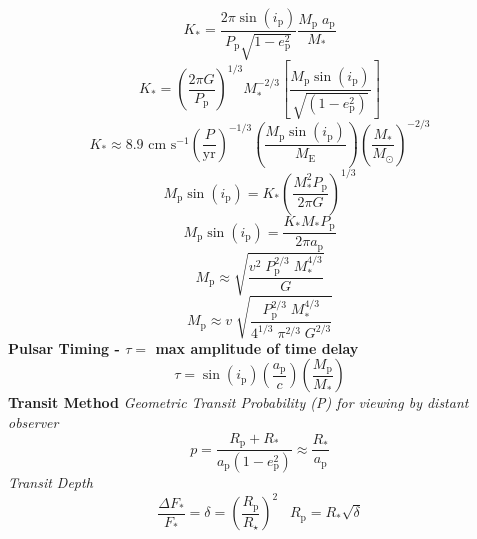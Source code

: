 \documentclass{article}
\begin{document}
\begin{equation}
K_\mathrm{*} = \frac {2 \pi \sin(i_\mathrm{p})} {P_\mathrm{p} \sqrt {1-e_\mathrm{p}^2}} \frac {M_\mathrm{p} \; a_\mathrm{p}} {M_\mathrm{*}}
\end{equation}
\begin{equation}
K_\mathrm{*} = \left(\frac {2 \pi G}{P_\mathrm{p}}\right)^{1/3} M_\mathrm{*}^{-2/3} \left[ \frac {M_\mathrm{p} \sin(i_\mathrm{p})}{\sqrt{\left(1-e_\mathrm{p}^2\right)}} \right]
\end{equation}
\begin{equation}
K_\mathrm{*} \approx 8.9 \text{ cm s}^{-1} \left( \frac{P}{\mathrm{yr}} \right)^{-1/3} \left( \frac{M_\mathrm{p} \sin(i_\mathrm{p})}{M_\mathrm{E} } \right) \left( \frac{M_\mathrm{*}}{M_\mathrm{\odot}} \right)^{-2/3}
\end{equation}
\begin{equation}
M_\mathrm{p} \sin(i_\mathrm{p}) = K_\mathrm{*} \left( \frac {M_\mathrm{*}^2 P_\mathrm{p}} {2 \pi G} \right) ^{1/3}
\end{equation}
\begin{equation}
M_\mathrm{p} \sin(i_\mathrm{p}) = \frac {K_\mathrm{*} M_\mathrm{*} P_\mathrm{p}} {2 \pi a_\mathrm{p}}
\end{equation}
\begin{equation}
M_\mathrm{p} \approx \sqrt{\frac{v^2 \; P^{2/3}_\mathrm{p} \; M^{4/3}_\mathrm{*}}{G}}
\end{equation}
\begin{equation}
M_\mathrm{p} \approx v \; \sqrt{\frac{P^{2/3}_\mathrm{p} \; M^{4/3}_\mathrm{*}}{4^{1/3} \; \pi^{2/3} \; G^{2/3}}}
\end{equation}
\textbf {Pulsar Timing - \(\tau = \) max amplitude of time delay}
\begin{equation}
\tau =  \sin(i_\mathrm{p}) \left( \frac {a_\mathrm{p}} {c} \right) \left( \frac {M_\mathrm{p}} {M_\mathrm{*}} \right)
\end{equation}
\textbf {Transit Method}
\textit{Geometric Transit Probability (P) for viewing by distant observer}
\begin{equation}
p = \frac{R_\mathrm{p} + R_\mathrm{*}}{a_\mathrm{p}(1 - e^2_\mathrm{p})} \approx \frac{R_\mathrm{*}}{a_\mathrm{p}}
\end{equation}
\textit{Transit Depth}
\begin{equation}
\frac{\Delta F_\mathrm{*}}{F_\mathrm{*}} = \delta =  \left( \frac {R_\mathrm{p}} {R_\star} \right)^2 \; \; \; R_\mathrm{p} = R_\mathrm{*} \sqrt{\delta}
\end{equation}
\end{document}
